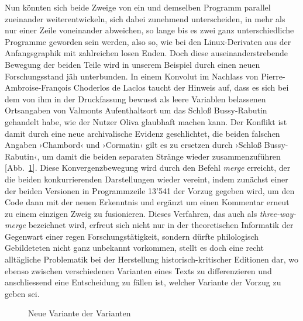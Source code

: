 \documentclass[a4paper,12pt]{article}
\newcommand{\inanf}[1]{›#1‹}
\newcommand{\anzeige}{\textbf{\color{hokkaido}\huge{\raisebox{-0.18ex}{$\bullet$}}\color{black}}}
\begin{document}
Nun könnten sich beide Zweige von ein und demselben Programm parallel zueinander weiterentwickeln, sich dabei zunehmend unterscheiden, in mehr als nur einer Zeile voneinander abweichen, so lange bis es zwei ganz unterschiedliche Programme geworden sein werden, also so, wie bei den Linux-Derivaten aus der Anfangsgraphik mit zahlreichen losen Enden. Doch diese auseinanderstrebende Bewegung der beiden Teile wird in unserem Beispiel durch einen neuen Forschungsstand jäh unterbunden. In einem Konvolut im Nachlass von Pierre-Ambroise-François Choderlos de Laclos taucht der Hinweis auf, dass es sich bei dem von ihm in der Druckfassung bewusst als leere Variablen belassenen Ortsangaben von Valmonts Aufenthaltsort um das Schloß Bussy-Rabutin gehandelt habe, wie der Nutzer {\color{olive}Oliva} glaubhaft machen kann. Der Konflikt ist damit durch eine neue archivalische Evidenz geschlichtet, die beiden falschen Angaben \inanf{Chambord} und \inanf{Cormatin} gilt es zu ersetzen durch \inanf{Schloß Bussy-Rabutin}, um damit die beiden separaten Stränge wieder zusammenzuführen [Abb.~\ref{abb:merge}\anzeige]. Diese Konvergenzbewegung wird durch den Befehl \emph{merge} erreicht, der die beiden konkurrierenden Darstellungen wieder vereint, indem zunächst einer der beiden Versionen in Programmzeile 13'541 der Vorzug gegeben wird, um den Code dann mit der neuen Erkenntnis und ergänzt um einen Kommentar erneut zu einem einzigen Zweig zu fusionieren. Dieses Verfahren, das auch als \emph{three-way-merge} bezeichnet wird, erfreut sich nicht nur in der theoretischen Informatik der Gegenwart einer regen Forschungstätigkeit, sondern dürfte philologisch Gebildeteten nicht ganz unbekannt vorkommen, stellt es doch eine recht alltägliche Problematik bei der Herstellung historisch-kritischer Editionen dar, wo ebenso zwischen verschiedenen Varianten eines Texts zu differenzieren und anschliessend eine Entscheidung zu fällen ist, welcher Variante der Vorzug zu geben sei.


\begin{figure}[hpt]
\begin{center}




\end{center}
\caption{Neue Variante der Varianten}\label{abb:merge}
\end{figure}
\end{document}
